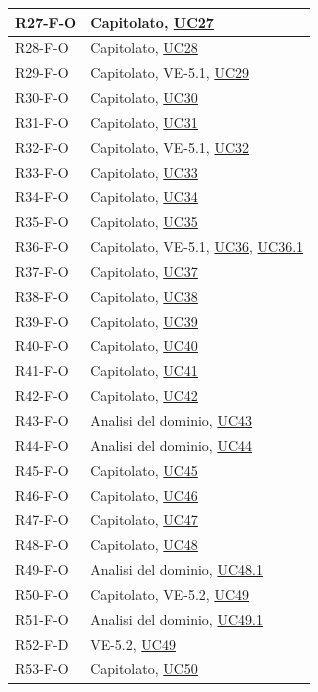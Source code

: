 \begin{longtable}{|p{2.8cm}|p{10.2cm}|}
	R27-F-O & Capitolato, \hyperlink{uc27}{UC27} \\ \hline
	R28-F-O & Capitolato, \hyperlink{uc28}{UC28} \\ \hline
	R29-F-O & Capitolato, VE-5.1, \hyperlink{uc29}{UC29} \\ \hline
	R30-F-O & Capitolato, \hyperlink{uc30}{UC30} \\ \hline
	R31-F-O & Capitolato, \hyperlink{uc31}{UC31} \\ \hline
	R32-F-O & Capitolato, VE-5.1, \hyperlink{uc32}{UC32} \\ \hline
	R33-F-O & Capitolato, \hyperlink{uc33}{UC33} \\ \hline
	R34-F-O & Capitolato, \hyperlink{uc34}{UC34} \\ \hline
	R35-F-O & Capitolato, \hyperlink{uc35}{UC35} \\ \hline
	R36-F-O & Capitolato, VE-5.1, \hyperlink{uc36}{UC36}, \hyperlink{uc36.1}{UC36.1} \\ \hline
	R37-F-O & Capitolato, \hyperlink{uc37}{UC37} \\ \hline
	R38-F-O & Capitolato, \hyperlink{uc38}{UC38} \\ \hline
	R39-F-O & Capitolato, \hyperlink{uc39}{UC39} \\ \hline
	R40-F-O & Capitolato, \hyperlink{uc40}{UC40} \\ \hline
	R41-F-O & Capitolato, \hyperlink{uc41}{UC41} \\ \hline
	R42-F-O & Capitolato, \hyperlink{uc42}{UC42} \\ \hline
	R43-F-O & Analisi del dominio, \hyperlink{uc43}{UC43} \\ \hline
	R44-F-O & Analisi del dominio, \hyperlink{uc44}{UC44} \\ \hline
	R45-F-O & Capitolato, \hyperlink{uc45}{UC45} \\ \hline
	R46-F-O & Capitolato, \hyperlink{uc46}{UC46} \\ \hline
	R47-F-O & Capitolato, \hyperlink{uc47}{UC47} \\ \hline
	R48-F-O & Capitolato, \hyperlink{uc48}{UC48} \\ \hline
	R49-F-O & Analisi del dominio, \hyperlink{uc48.1}{UC48.1} \\ \hline
	R50-F-O & Capitolato, VE-5.2, \hyperlink{uc49}{UC49} \\ \hline
	R51-F-O & Analisi del dominio, \hyperlink{uc49.1}{UC49.1} \\ \hline
	R52-F-D & VE-5.2, \hyperlink{uc49}{UC49} \\ \hline
	R53-F-O & Capitolato, \hyperlink{uc50}{UC50} \\ \hline

\end{longtable}
